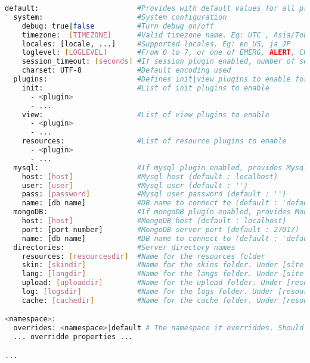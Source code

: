\documentclass[pdftex,12pt,a4paper]{article}
\begin{document}
\begin{lstlisting}[label=configuration-values,caption=Configuration values,language=bash]
default:                       #Provides with default values for all properties for subclassing namespaces
  system:                      #System configuration
    debug: true|false          #Turn debug on/off
    timezone:  [TIMEZONE]      #Valid timezone name. Eg: UTC , Asia/Tokyo
    locales: [locale, ...]     #Supported locales. Eg: en_US, ja_JP
    loglevel: [LOGLEVEL]       #From 0 to 7, or one of EMERG, ALERT, CRIT, ERR, WARN, NOTICE, INFO, DEBUG
    session_timeout: [seconds] #If session plugin enabled, number of seconds until session timeouts
    charset: UTF-8             #Default encoding used
  plugins:                     #Defines init|view plugins to enable for current namespace
    init:                      #List of init plugins to enable
      - <plugin>
      - ...
    view:                      #List of view plugins to enable
      - <plugin>
      - ...
    resources:                 #List of resource plugins to enable
      - <plugin>
      - ...
  mysql:                       #If mysql plugin enabled, provides Mysql DB connection info
    host: [host]               #Mysql host (default : localhost)
    user: [user]               #Mysql user (default : '')
    pass: [password]           #Mysql user password (default : '')
    name: [db name]            #DB name to connect to (default : 'default')
  mongoDB:                     #If mongoDB plugin enabled, provides MongoDB connection info
    host: [host]               #MongoDB host (default : localhost)
    port: [port number]        #MongoDB server port (default : 27017)
    name: [db name]            #DB name to connect to (default : 'default')
  directories:                 #Server directory names
    resources: [resourcesdir]  #Name for the resources folder
    skin: [skindir]            #Name for the skins folder. Under [site root dir (DATA_DIR)]
    lang: [langdir]            #Name for the langs folder. Under [site root dir (DATA_DIR)]
    upload: [uploaddir]        #Name for the upload folder. Under [resourcesdir]
    log: [logsdir]             #Name for the logs folder. Under [resourcesdir]
    cache: [cachedir]          #Name for the cache folder. Under [resourcesdir]

<namespace>:
  overrides: <namespace>|default # The namespace it overriddes. Should always override 'default' if none.
  ... overridde properties ...

...
\end{lstlisting}

\cleardoublepage

\printindex

\eod
\end{document}
